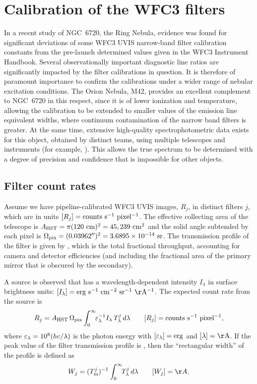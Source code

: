 \documentclass[preprint, 10pt]{aastex}
\begin{document}
\section{Calibration of the WFC3 filters}

In a recent study \citep{ODell:2013b} of NGC~6720, the Ring Nebula,
evidence was found for significant deviations of some WFC3 UVIS
narrow-band filter calibration constants from the pre-launch
determined values given in the WFC3 Instrument Handbook.  Several
observationally important diagnostic line ratios are significantly
impacted by the filter calibrations in question.  It is therefore of
paramount importance to confirm the calibrations under a wider range
of nebular excitation conditions.  The Orion Nebula, M42, provides an
excellent complement to NGC~6720 in this respect, since it is of lower
ionization and temperature, allowing the calibration to be extended to
smaller values of the emission line equivalent widths, where continuum
contamination of the narrow band filters is greater.  At the same
time, extensive high-quality spectrophotometric data exists for this object,
obtained by distinct teams, using multiple telescopes and instruments
(for example, \citealp{Mesa-Delgado:2008b, ODell:2010a}).  This allows
the true spectrum to be determined with a degree of precision and
confidence that is impossible for other objects.

\subsection{Filter count rates}
\label{sec:counts}


Assume we have pipeline-calibrated WFC3 UVIS images, \(R_j\), 
in distinct filters \(j\), 
which are in units \([R_j] = \U{counts\ s^{-1}\ pixel^{-1}}\).  The
effective collecting area of the telescope is \(A_{\mathrm{HST}} =
\pi (120\ \mathrm{cm})^2 = 45,239\ \mathrm{cm^2}\) and the solid angle
subtended by each pixel is \(\Omega_{\mathrm{pix}} = (0.03962'')^2 = 3.6895\times 10^{-14}\
\mathrm{sr}\).  
The transmission profile of the filter is given by
, which is the total fractional throughput, 
accounting for camera and detector efficiencies (and including the
fractional area of the primary mirror that is obscured by the secondary).  

A source is observed that has a wavelength-dependent intensity 
\(I_\lambda\) in surface brightness units: 
\([I_\lambda] = \U{erg\ s^{-1}\ cm^{-2}\ sr^{-1}\ \AA^{-1}}\). 
The expected count rate from the source is
\begin{equation}
  \label{eq:rate}
  R_j = \Area\, \Pixel \int_0^\infty \!\!\Elam^{-1} I_\lambda\,
  \Tlam{j} \, d\lambda \quad\quad [R_j] = \U{counts\ s^{-1}\ pixel^{-1}}, 
\end{equation}
where \(\varepsilon_\lambda = 10^{8} (h c / \lambda)\) is the photon energy with
\([\varepsilon_\lambda] = \mathrm{erg}\) and \([\lambda] = \U{\AA}\). 
If the peak value of the filter transmission profile is , then the
``rectangular width'' of the profile is defined as
\begin{equation}
  \label{eq:width}
  W_j = (\Tmax{j})^{-1} \int_0^\infty \!\!\Tlam{j}\, d\lambda 
  \quad\quad [W_j] = \AA.
\end{equation}
\end{document}
